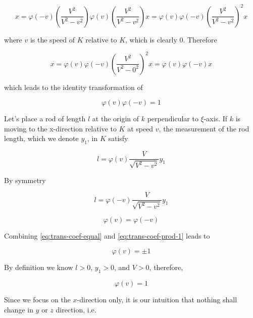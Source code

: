 \begin{equation}
    x = \varphi(-v)\left( \frac{V^2}{V^2 - v^2} \right) \varphi(v)\left( \frac{V^2}{V^2 - v^2} \right) x = \varphi(v)\varphi(-v)\left( \frac{V^2}{V^2 - v^2} \right)^2 x
\end{equation}

where $v$ is the speed of $K$ relative to $K$, which is clearly 0. Therefore

\begin{equation}
    x = \varphi(v)\varphi(-v)\left( \frac{V^2}{V^2 - 0^2} \right)^2 x = \varphi(v)\varphi(-v) x
\end{equation}

which leads to the identity transformation of

\begin{equation}\label{eq:trans-coef-prod-1}
\varphi(v)\varphi(-v) = 1
\end{equation}

Let's place a rod of length $l$ at the origin of $k$ perpendicular to $\xi$-axis. If $k$ is moving to the x-direction
relative to $K$ at speed $v$, the measurement of the rod length, which we denote $y_1$, in $K$ satisfy

\begin{equation}
    l = \varphi(v)\frac{V}{\sqrt{V^2 - v^2}}y_1
\end{equation}

By symmetry

\begin{equation}
    l = \varphi(-v)\frac{V}{\sqrt{V^2 - v^2}}y_1
\end{equation}

\begin{equation}\label{eq:trans-coef-equal}
\varphi(v) = \varphi(-v)
\end{equation}

Combining \ref{eq:trans-coef-equal} and \ref{eq:trans-coef-prod-1} leads to

\begin{equation}
    \varphi(v) = \pm 1
\end{equation}

By definition we know $l > 0$, $y_1 > 0$, and $V > 0$, therefore,

\begin{equation}
    \varphi(v) = 1
\end{equation}

Since we focus on the $x$-direction only, it is our intuition that nothing shall change in $y$ or $z$ direction, i.e.

